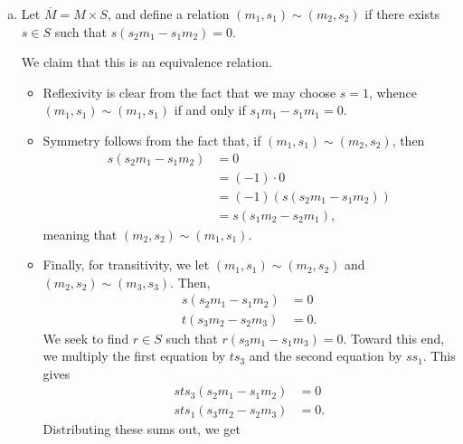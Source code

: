 \documentclass[10pt]{mypackage}
\begin{document}
\begin{solution}\hfill
  \begin{enumerate}[(a)]
    \item Let $ \overline{M} = M\times S $, and define a relation $\left( m_1,s_1 \right)\sim \left( m_2,s_2 \right)$ if there exists $s\in S$ such that $s\left( s_2m_1 - s_1m_2 \right) = 0$.\newline

      We claim that this is an equivalence relation.
      \begin{itemize}
        \item Reflexivity is clear from the fact that we may choose $s = 1$, whence $\left( m_1,s_1 \right)\sim \left( m_1,s_1 \right)$ if and only if $s_1m_1 - s_1m_1 = 0$.
        \item Symmetry follows from the fact that, if $\left( m_1,s_1 \right)\sim \left( m_2,s_2 \right)$, then
          \begin{align*}
            s\left( s_2m_1 - s_1m_2 \right) &= 0\\
                                            &= \left( -1 \right)\cdot 0\\
                                            &= \left( -1 \right)\left( s\left( s_2m_1 - s_1m_2 \right) \right)\\
                                            &= s\left( s_1m_2 - s_2m_1 \right),
          \end{align*}
          meaning that $\left( m_2,s_2 \right)\sim \left( m_1,s_1 \right)$.
        \item Finally, for transitivity, we let $\left( m_1,s_1 \right)\sim \left( m_2,s_2 \right)$ and $\left( m_2,s_2 \right)\sim \left( m_3,s_3 \right)$. Then,
          \begin{align*}
            s\left( s_2m_1 - s_1m_2 \right) &= 0\\
            t\left( s_3m_2 - s_2m_3 \right) &= 0.
          \end{align*}
          We seek to find $r\in S$ such that $r\left( s_3m_1 - s_1m_3 \right) = 0$. Toward this end, we multiply the first equation by $ts_3$ and the second equation by $ss_1$. This gives
          \begin{align*}
            sts_3\left( s_2m_1 - s_1m_2 \right) &= 0\\
            sts_1\left( s_3m_2 - s_2m_3 \right) &= 0.
          \end{align*}
          Distributing these sums out, we get
          \begin{align*}

\end{align*}
\end{itemize}
\end{enumerate}
\end{solution}
\end{document}
